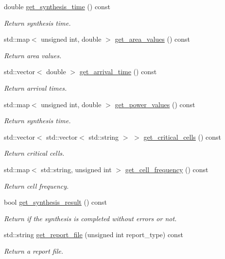 \begin{DoxyCompactItemize}
double \hyperlink{classDesignCompilerWrapper_ac547993a62653652618721e2b409228e}{get\+\_\+synthesis\+\_\+time} () const
\begin{DoxyCompactList}\small\item\em Return synthesis time. \end{DoxyCompactList}\item 
std\+::map$<$ unsigned int, double $>$ \hyperlink{classDesignCompilerWrapper_ac746e21a0c2859cf60a7c06b691fabe2}{get\+\_\+area\+\_\+values} () const
\begin{DoxyCompactList}\small\item\em Return area values. \end{DoxyCompactList}\item 
std\+::vector$<$ double $>$ \hyperlink{classDesignCompilerWrapper_a803583634fb9471246a45af96a40da01}{get\+\_\+arrival\+\_\+time} () const
\begin{DoxyCompactList}\small\item\em Return arrival times. \end{DoxyCompactList}\item 
std\+::map$<$ unsigned int, double $>$ \hyperlink{classDesignCompilerWrapper_a9668d7b28281b9144face18e60271c07}{get\+\_\+power\+\_\+values} () const
\begin{DoxyCompactList}\small\item\em Return synthesis time. \end{DoxyCompactList}\item 
std\+::vector$<$ std\+::vector$<$ std\+::string $>$ $>$ \hyperlink{classDesignCompilerWrapper_ab41a5f45b89b2243fb7c6b380a8bbccd}{get\+\_\+critical\+\_\+cells} () const
\begin{DoxyCompactList}\small\item\em Return critical cells. \end{DoxyCompactList}\item 
std\+::map$<$ std\+::string, unsigned int $>$ \hyperlink{classDesignCompilerWrapper_a667aebdb190c3208289a261358e1e2ca}{get\+\_\+cell\+\_\+frequency} () const
\begin{DoxyCompactList}\small\item\em Return cell frequency. \end{DoxyCompactList}\item 
bool \hyperlink{classDesignCompilerWrapper_ab343423f9702cd1f35cae699ada77332}{get\+\_\+synthesis\+\_\+result} () const
\begin{DoxyCompactList}\small\item\em Return if the synthesis is completed without errors or not. \end{DoxyCompactList}\item 
std\+::string \hyperlink{classDesignCompilerWrapper_a6e7c15db8b5d495810902ee854289abf}{get\+\_\+report\+\_\+file} (unsigned int report\+\_\+type) const
\begin{DoxyCompactList}\small\item\em Return a report file. \end{DoxyCompactList}\end{DoxyCompactItemize}
